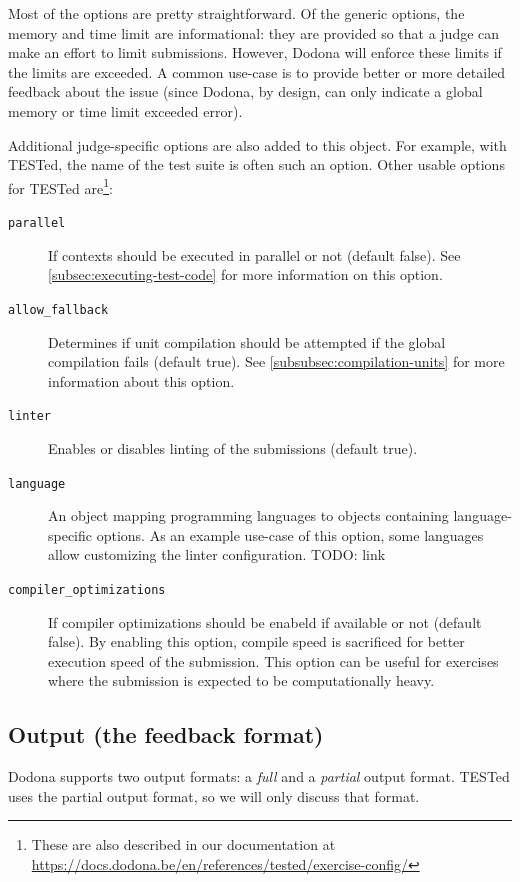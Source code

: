 \documentclass[../main]{subfiles}
\begin{document}
Most of the options are pretty straightforward.
Of the generic options, the memory and time limit are informational: they are provided so that a judge can make an effort to limit submissions.
However, Dodona will enforce these limits if the limits are exceeded.
A common use-case is to provide better or more detailed feedback about the issue (since Dodona, by design, can only indicate a global memory or time limit exceeded error).

Additional judge-specific options are also added to this object.
For example, with TESTed, the name of the test suite is often such an option.
Other usable options for TESTed are\footnote{These are also described in our documentation at \url{https://docs.dodona.be/en/references/tested/exercise-config/}}:

\begin{description}
    \item[\texttt{parallel}] If contexts should be executed in parallel or not (default false). See \cref{subsec:executing-test-code} for more information on this option.
    \item[\texttt{allow\_fallback}] Determines if unit compilation should be attempted if the global compilation fails (default true). See \cref{subsubsec:compilation-units} for more information about this option.
    \item[\texttt{linter}] Enables or disables linting of the submissions (default true).
    \item[\texttt{language}] An object mapping programming languages to objects containing language-specific options. As an example use-case of this option, some languages allow customizing the linter configuration. TODO: link
    \item[\texttt{compiler\_optimizations}] If compiler optimizations should be enabeld if available or not (default false). By enabling this option, compile speed is sacrificed for better execution speed of the submission. This option can be useful for exercises where the submission is expected to be computationally heavy.
\end{description}

\subsection{Output (the feedback format)}
\label{subsec:dodona-output}

Dodona supports two output formats: a \emph{full} and a \emph{partial} output format.
TESTed uses the partial output format, so we will only discuss that format.
\end{document}
